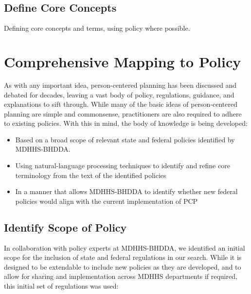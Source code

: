 \documentclass[
]{book}
\providecommand{\tightlist}{%
  \setlength{\itemsep}{0pt}\setlength{\parskip}{0pt}}
\begin{document}
\hypertarget{define}{%
\section{Define Core Concepts}\label{define}}

Defining core concepts and terms, using policy where possible.

\hypertarget{policy}{%
\chapter{Comprehensive Mapping to Policy}\label{policy}}

As with any important idea, person-centered planning has been discussed and debated for decades, leaving a vast body of policy, regulations, guidance, and explanations to sift through. While many of the basic ideas of person-centered planning are simple and commonsense, practitioners are also required to adhere to existing policies. With this in mind, the body of knowledge is being developed:

\begin{itemize}
\tightlist
\item
  Based on a broad scope of relevant state and federal policies identified by MDHHS-BHDDA.
\item
  Using natural-language processing techniques to identify and refine core terminology from the text of the identified policies
\item
  In a manner that allows MDHHS-BHDDA to identify whether new federal policies would align with the current implementation of PCP
\end{itemize}

\hypertarget{identify-scope-of-policy}{%
\section{Identify Scope of Policy}\label{identify-scope-of-policy}}

In collaboration with policy experts at MDHHS-BHDDA, we identified an initial scope for the inclusion of state and federal regulations in our search. While it is designed to be extendable to include new policies as they are developed, and to allow for sharing and implementation across MDHHS departments if required, this initial set of regulations was used:
\end{document}
